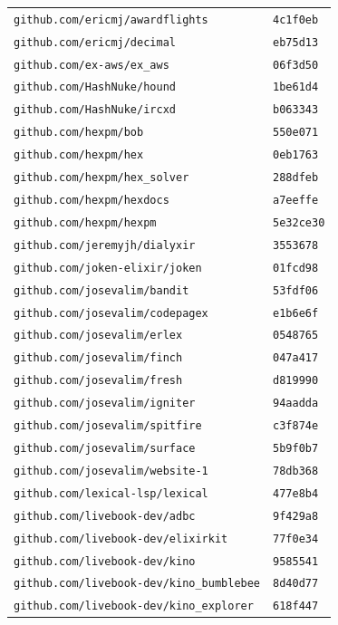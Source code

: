 \begin{longtable}{@{}p{} l@{}}
\texttt{github.com/ericmj/awardflights} & \texttt{4c1f0eb} \\
\texttt{github.com/ericmj/decimal} & \texttt{eb75d13} \\
\texttt{github.com/ex-aws/ex\_aws} & \texttt{06f3d50} \\
\texttt{github.com/HashNuke/hound} & \texttt{1be61d4} \\
\texttt{github.com/HashNuke/ircxd} & \texttt{b063343} \\
\texttt{github.com/hexpm/bob} & \texttt{550e071} \\
\texttt{github.com/hexpm/hex} & \texttt{0eb1763} \\
\texttt{github.com/hexpm/hex\_solver} & \texttt{288dfeb} \\
\texttt{github.com/hexpm/hexdocs} & \texttt{a7eeffe} \\
\texttt{github.com/hexpm/hexpm} & \texttt{5e32ce30} \\
\texttt{github.com/jeremyjh/dialyxir} & \texttt{3553678} \\
\texttt{github.com/joken-elixir/joken} & \texttt{01fcd98} \\
\texttt{github.com/josevalim/bandit} & \texttt{53fdf06} \\
\texttt{github.com/josevalim/codepagex} & \texttt{e1b6e6f} \\
\texttt{github.com/josevalim/erlex} & \texttt{0548765} \\
\texttt{github.com/josevalim/finch} & \texttt{047a417} \\
\texttt{github.com/josevalim/fresh} & \texttt{d819990} \\
\texttt{github.com/josevalim/igniter} & \texttt{94aadda} \\
\texttt{github.com/josevalim/spitfire} & \texttt{c3f874e} \\
\texttt{github.com/josevalim/surface} & \texttt{5b9f0b7} \\
\texttt{github.com/josevalim/website-1} & \texttt{78db368} \\
\texttt{github.com/lexical-lsp/lexical} & \texttt{477e8b4} \\
\texttt{github.com/livebook-dev/adbc} & \texttt{9f429a8} \\
\texttt{github.com/livebook-dev/elixirkit} & \texttt{77f0e34} \\
\texttt{github.com/livebook-dev/kino} & \texttt{9585541} \\
\texttt{github.com/livebook-dev/kino\_bumblebee} & \texttt{8d40d77} \\
\texttt{github.com/livebook-dev/kino\_explorer} & \texttt{618f447} \\

\end{longtable}
